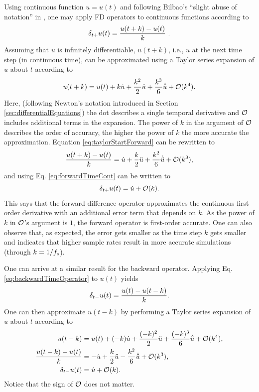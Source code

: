 Using continuous function $u=u(t)$ and following Bilbao's ``slight abuse of notation'' in \cite{theBible}, one may apply FD operators to continuous functions according to 
\begin{equation}\label{eq:forwardTimeCont}
    \delta_{t+} u(t) = \frac{u(t+k) - u(t)}{k}\ .
\end{equation}
%
Assuming that $u$ is infinitely differentiable, $u(t+k)$, i.e., $u$ at the next time step (in continuous time), can be approximated using a Taylor series expansion of $u$ about $t$ according to
\begin{equation}\label{eq:taylorStartForward}
    u(t+k) = u(t) + k \dot u + \frac{k^2}{2} \ddot u + \frac{k^3}{6} \dot{\ddot{u}} + \mathcal{O}(k^4).
\end{equation}
Here, (following Newton's notation introduced in Section \ref{sec:differentialEquations}) the dot describes a single temporal derivative and $\mathcal{O}$ includes additional terms in the expansion. The power of $k$ in the argument of $\mathcal{O}$ describes the order of accuracy, the higher the power of $k$ the more accurate the approximation. Equation \eqref{eq:taylorStartForward} can be rewritten to 
\begin{equation*}
    \frac{u(t+k) - u(t)}{k} = \dot u + \frac{k}{2} \ddot u +\frac{k^2}{6} \dot{\ddot{u}} + \mathcal{O}(k^3),
\end{equation*}
and using Eq. \eqref{eq:forwardTimeCont} can be written to
\begin{equation}
    \delta_{t+} u(t) = \dot u + \mathcal{O}(k).
\end{equation}
This says that the forward difference operator approximates the continuous first order derivative with an additional error term that depends on $k$.
As the power of $k$ in $\mathcal{O}$'s argument is $1$, the forward operator is first-order accurate. One can also observe that, as expected, the error gets smaller as the time step $k$ gets smaller and indicates that higher sample rates result in more accurate simulations (through $k=1/f_\text{s}$). 

One can arrive at a similar result for the backward operator. Applying Eq. \eqref{eq:backwardTimeOperator} to $u(t) $ yields
\begin{equation}
    \delta_{t-} u(t) = \frac{u(t) - u(t-k)}{k}.
\end{equation}
One can then approximate $u(t-k)$ by performing a Taylor series expansion of $u$ about $t$ according to
\begin{align}
    u(t-k) &= u(t) + (-k) \dot u + \frac{(-k)^2}{2} \ddot u +\frac{(-k)^3}{6}\dot{\ddot{u}} + \mathcal{O}(k^4),\label{eq:taylorStartBackward}\\
    \frac{u(t-k) - u(t)}{k} &= -\dot u + \frac{k}{2} \ddot u - \frac{k^2}{6}\dot{\ddot{u}} + \mathcal{O}(k^3),\nonumber\\
    \delta_{t-} u(t) &= \dot u + \mathcal{O}(k).
\end{align}
Notice that the sign of $\mathcal{O}$ does not matter.

